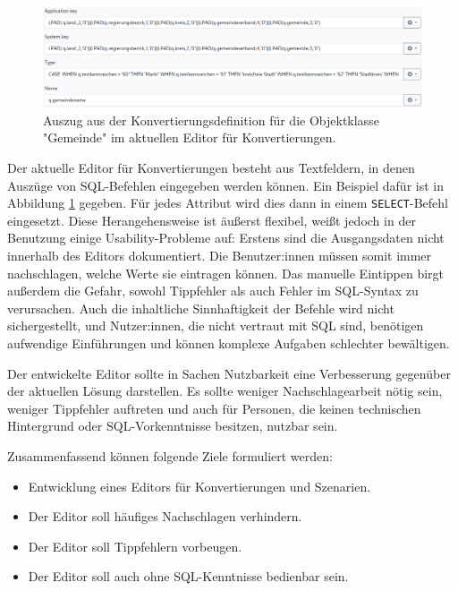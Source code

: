 \begin{figure}[ht]
  \centering
  \includegraphics[width=.95\textwidth]{assets/conversion-gemeinde.png}
  \caption{Auszug aus der Konvertierungsdefinition für die Objektklasse "Gemeinde" im aktuellen Editor für Konvertierungen.}
  \label{fig:conversion-gemeinde}
\end{figure}

Der aktuelle Editor für Konvertierungen besteht aus Textfeldern, in denen Auszüge von \ac{SQL}-Befehlen eingegeben werden können. Ein Beispiel dafür ist in Abbildung \ref{fig:conversion-gemeinde} gegeben. Für jedes Attribut wird dies dann in einem \texttt{SELECT}-Befehl eingesetzt. Diese Herangehensweise ist äußerst flexibel, weißt jedoch in der Benutzung einige Usability-Probleme auf: Erstens sind die Ausgangsdaten nicht innerhalb des Editors dokumentiert. Die Benutzer:innen müssen somit immer nachschlagen, welche Werte sie eintragen können. Das manuelle Eintippen birgt außerdem die Gefahr, sowohl Tippfehler als auch Fehler im \ac{SQL}-Syntax zu verursachen. Auch die inhaltliche Sinnhaftigkeit der Befehle wird nicht sichergestellt, und Nutzer:innen, die nicht vertraut mit SQL sind, benötigen aufwendige Einführungen und können komplexe Aufgaben schlechter bewältigen. 

Der entwickelte Editor sollte in Sachen Nutzbarkeit eine Verbesserung gegenüber der aktuellen Lösung darstellen. Es sollte weniger Nachschlagearbeit nötig sein, weniger Tippfehler auftreten und auch für Personen, die keinen technischen Hintergrund oder \ac{SQL}-Vorkenntnisse besitzen, nutzbar sein.

Zusammenfassend können folgende Ziele formuliert werden:
\begin{itemize}
  \item Entwicklung eines Editors für Konvertierungen und Szenarien.
  \item Der Editor soll häufiges Nachschlagen verhindern.
  \item Der Editor soll Tippfehlern vorbeugen.
  \item Der Editor soll auch ohne \ac{SQL}-Kenntnisse bedienbar sein.
\end{itemize}
